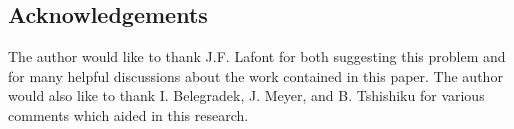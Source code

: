 \documentclass[10pt]{amsart}
\theoremstyle{definition}
\theoremstyle{remark}
\numberwithin{equation}{section}
\begin{document}






























\subsection*{Acknowledgements}  
The author would like to thank J.F. Lafont for both suggesting this problem and for many helpful discussions about the work contained in this paper.
The author would also like to thank I. Belegradek, J. Meyer, and B. Tshishiku for various comments which aided in this research.
 
	











\vskip 20pt
\end{document}

